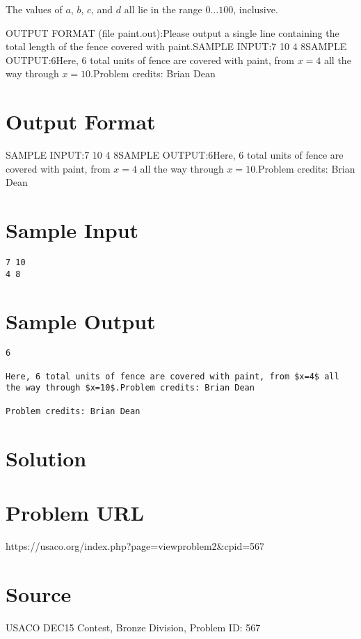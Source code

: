 \documentclass[12pt]{article}
\begin{document}
The values of $a$, $b$, $c$, and $d$ all lie in the range $0 \ldots 100$, inclusive.

OUTPUT FORMAT (file paint.out):Please output a single line containing the total length of the fence covered with paint.SAMPLE INPUT:7 10
4 8SAMPLE OUTPUT:6Here, 6 total units of fence are covered with paint, from $x=4$ all
the way through $x=10$.Problem credits: Brian Dean

\section*{Output Format}
SAMPLE INPUT:7 10
4 8SAMPLE OUTPUT:6Here, 6 total units of fence are covered with paint, from $x=4$ all
the way through $x=10$.Problem credits: Brian Dean

\section*{Sample Input}
\begin{verbatim}
7 10
4 8
\end{verbatim}

\section*{Sample Output}
\begin{verbatim}
6

Here, 6 total units of fence are covered with paint, from $x=4$ all
the way through $x=10$.Problem credits: Brian Dean

Problem credits: Brian Dean
\end{verbatim}

\section*{Solution}


\section*{Problem URL}
https://usaco.org/index.php?page=viewproblem2&cpid=567

\section*{Source}
USACO DEC15 Contest, Bronze Division, Problem ID: 567
\end{document}
